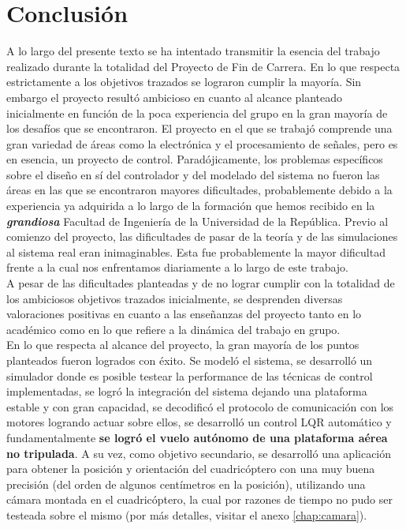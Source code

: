 \documentclass[main]{subfiles}
\begin{document}
\chapter*{Conclusi\'on}

A lo largo del presente texto se ha intentado transmitir la esencia  del trabajo realizado durante la totalidad del Proyecto de Fin de Carrera. En lo que respecta estrictamente a los objetivos trazados se lograron cumplir la mayoría. Sin embargo el proyecto result\'o ambicioso en cuanto al alcance planteado inicialmente en funci\'on de la poca experiencia del grupo en la gran mayor\'ia de los desaf\'ios que se encontraron. El proyecto en el que se trabaj\'o comprende una gran variedad de \'areas como la electr\'onica y el procesamiento de señales, pero es en esencia, un proyecto de control. Parad\'ojicamente, los problemas espec\'ificos sobre el diseño en s\'i del controlador y del modelado del sistema no fueron las \'areas en las que se encontraron mayores dificultades, probablemente debido a la experiencia ya adquirida a lo largo de la formaci\'on que hemos recibido en la \emph{\textbf{grandiosa}} Facultad de Ingeniería de la Universidad de la República. Previo al comienzo del proyecto, las dificultades de pasar de la teor\'ia y de las simulaciones al sistema real eran inimaginables. Esta fue probablemente la mayor dificultad frente a la cual nos enfrentamos diariamente a lo largo de este trabajo.\\

A pesar de las dificultades planteadas y de no lograr cumplir con la totalidad de los ambiciosos objetivos trazados inicialmente, se desprenden diversas valoraciones positivas en cuanto a las enseñanzas del proyecto tanto en lo acad\'emico como en lo que refiere a la din\'amica del trabajo en grupo.\\

En lo que respecta al alcance del proyecto, la gran mayoría de los puntos planteados fueron logrados con \'exito. Se modeló el sistema, se desarrolló un simulador donde es posible testear la performance de las técnicas de control implementadas, se logró la integración del sistema dejando una plataforma estable y con gran capacidad, se decodificó el protocolo de comunicación con los motores logrando actuar sobre ellos, se desarrolló un control LQR automático y fundamentalmente \textbf{se logró el vuelo autónomo de una plataforma aérea no tripulada}. A su vez, como objetivo secundario, se desarrolló una aplicación para obtener la posición y orientación del cuadricóptero con una muy buena precisión (del orden de algunos centímetros en la posición), utilizando una cámara montada en el cuadricóptero, la cual por razones de tiempo no pudo ser testeada sobre el mismo (por más detalles, visitar el anexo \ref{chap:camara}).\\
\end{document}
